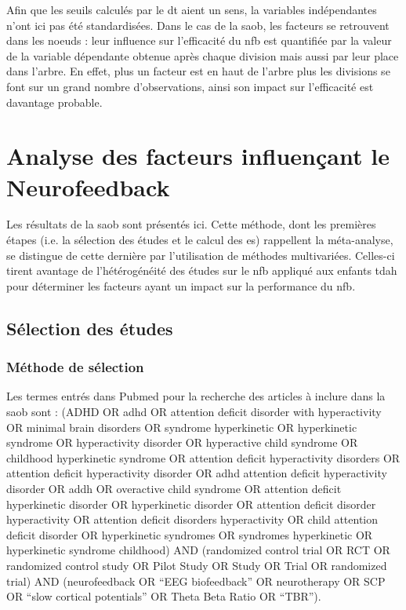 Afin que les seuils calculés par le \gls{dt} aient un sens, la variables indépendantes n'ont ici pas été standardisées. Dans le cas de la \gls{saob}, 
les facteurs se retrouvent dans les noeuds : leur influence sur l'efficacité du \gls{nfb} est quantifiée par la valeur de la variable dépendante 
obtenue après chaque division mais aussi par leur place dans l'arbre. En effet, plus un facteur est en haut de l'arbre plus les divisions se font sur un grand nombre
d'observations, ainsi son impact sur l'efficacité est davantage probable.

\section{Analyse des facteurs influençant le Neurofeedback} 

Les résultats de la \gls{saob} sont présentés ici. Cette méthode, dont les premières étapes (i.e. la sélection des études et le calcul des \gls{es}) rappellent
la méta-analyse, se distingue de cette dernière par l'utilisation de méthodes multivariées. Celles-ci tirent avantage de l'hétérogénéité des études
sur le \gls{nfb} appliqué aux enfants \gls{tdah} pour déterminer les facteurs ayant un impact sur la performance du \gls{nfb}.

\subsection{Sélection des études} \label{saob_selection_studies}

\subsubsection{Méthode de sélection}

Les termes entrés dans Pubmed pour la recherche des articles à inclure dans la \gls{saob} sont :
(ADHD OR adhd OR attention deficit disorder with hyperactivity OR minimal brain disorders OR syndrome hyperkinetic OR hyperkinetic
syndrome OR hyperactivity disorder OR hyperactive child syndrome OR childhood hyperkinetic syndrome OR attention deficit hyperactivity disorders
OR attention deficit hyperactivity disorder OR adhd attention deficit hyperactivity disorder OR addh OR overactive child syndrome OR attention deficit 
hyperkinetic disorder OR hyperkinetic disorder OR attention deficit disorder hyperactivity OR attention deficit disorders hyperactivity OR child 
attention deficit disorder OR hyperkinetic syndromes OR syndromes hyperkinetic OR hyperkinetic syndrome childhood) AND 
(randomized control trial OR RCT OR randomized control study OR Pilot Study OR Study OR Trial OR randomized trial) AND 
(neurofeedback OR “EEG biofeedback” OR neurotherapy OR SCP OR “slow cortical potentials” OR Theta Beta Ratio OR “TBR”). 

